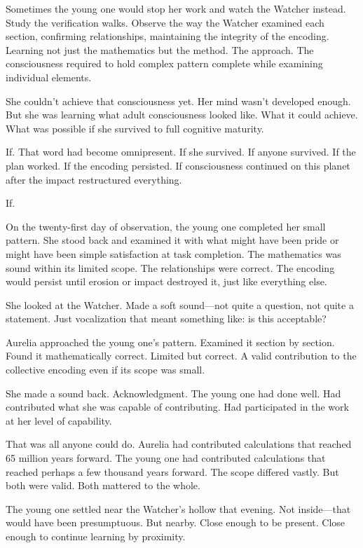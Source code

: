 Sometimes the young one would stop her work and watch the Watcher instead. Study the verification walks. Observe the way the Watcher examined each section, confirming relationships, maintaining the integrity of the encoding. Learning not just the mathematics but the method. The approach. The consciousness required to hold complex pattern complete while examining individual elements.

She couldn't achieve that consciousness yet. Her mind wasn't developed enough. But she was learning what adult consciousness looked like. What it could achieve. What was possible if she survived to full cognitive maturity.

If. That word had become omnipresent. If she survived. If anyone survived. If the plan worked. If the encoding persisted. If consciousness continued on this planet after the impact restructured everything.

If.

\scenebreak

On the twenty-first day of observation, the young one completed her small pattern. She stood back and examined it with what might have been pride or might have been simple satisfaction at task completion. The mathematics was sound within its limited scope. The relationships were correct. The encoding would persist until erosion or impact destroyed it, just like everything else.

She looked at the Watcher. Made a soft sound—not quite a question, not quite a statement. Just vocalization that meant something like: is this acceptable?

Aurelia approached the young one's pattern. Examined it section by section. Found it mathematically correct. Limited but correct. A valid contribution to the collective encoding even if its scope was small.

She made a sound back. Acknowledgment. The young one had done well. Had contributed what she was capable of contributing. Had participated in the work at her level of capability.

That was all anyone could do. Aurelia had contributed calculations that reached 65 million years forward. The young one had contributed calculations that reached perhaps a few thousand years forward. The scope differed vastly. But both were valid. Both mattered to the whole.

The young one settled near the Watcher's hollow that evening. Not inside—that would have been presumptuous. But nearby. Close enough to be present. Close enough to continue learning by proximity.

